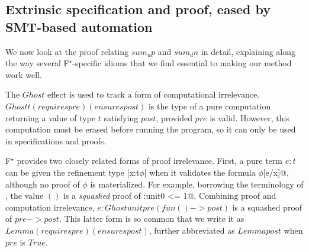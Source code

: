 \documentclass[sigplan,screen]{acmart}\settopmatter{}
\newcommand\fstar{F$^\star$\xspace}
\newcommand{\comm}[3]{\ifcheckpagebudget\else\ifdraft{\maybecolor{#1}[#2: #3]}\fi\fi}
\newcommand{\nik}[1]{\comm{dkpurple}{Nik}{#1}}
\newcommand{\ch}[1]{\comm{teal}{CH}{#1}}
\begin{document}

\subsection{Extrinsic specification and proof, eased by SMT-based automation}
\label{sec:lemmas}
\label{sec:smt}


%
We now look at the proof relating \ls$sum_up$ and \ls$sum_dn$ in
detail, explaining along the way several \fstar-specific idioms that
we find essential to making our method work well.

The \ls$Ghost$ effect is used to track a
form of computational irrelevance.
%
\ls$Ghost t (requires pre) (ensures post)$ is the type of a
pure computation returning a value of type \ls$t$ satisfying
\ls$post$, provided \ls$pre$ is valid.
%
However, this computation must be erased before running the program,
so it can only be used in specifications and proofs.

\fstar
provides two closely related forms of proof irrelevance. First, a pure
term \ls$e:t$ can be given the refinement type \ls|x:t{$\phi$}| when it
validates the formula \ls@$\phi$[e/x]@, although no proof of $\phi$ is
materialized. For example, borrowing the terminology
of \citet{Nogin02}, the value \ls$()$ is a \emph{squashed} proof
of \ls@u:unit{0 <= 1}@. Combining proof and computation irrelevance,
%
\ls$e : Ghost unit pre (fun () -> post)$ is a squashed proof of \ls$pre -> post$.
%
This latter form is so common that we write it as
%
\ls$Lemma (requires pre) (ensures post)$,
further abbreviated as \ls$Lemma post$ when \ls$pre$ is \ls$True$.
\end{document}
